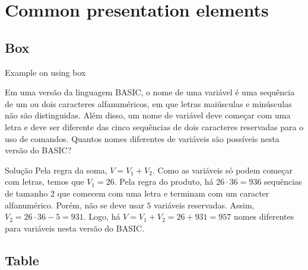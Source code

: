 \section{Common presentation elements}

\subsection{Box}

\begin{frame}{Example on using box}

    \footnotesize
    
    \begin{ex}
        Em uma versão da linguagem BASIC, o nome de uma variável é uma sequência de um ou dois caracteres alfanuméricos, em que letras maiúsculas e minúsculas não são distinguidas. Além disso, um nome de variável deve começar com uma letra e deve ser diferente das cinco sequências de dois caracteres reservadas para o uso de comandos. Quantos nomes diferentes de variáveis são possíveis nesta versão do BASIC?
    \end{ex}
    
    \begin{block}{Solução}
        Pela regra da soma, $V=V_1+V_2$. Como as variáveis só podem começar com letras, temos que $V_1=26$. Pela regra do produto, há $26\cdot 36=936$ sequências de tamanho $2$ que comecem com uma letra e terminam com um caracter alfanumérico. Porém, não se deve usar $5$ variáveis reservadas. Assim, $V_2=26\cdot 36-5=931$. Logo, há $V=V_1+V_2 = 26+931=957$ nomes diferentes para variáveis nesta versão do BASIC.
    \end{block}

\end{frame}


\subsection{Table}

